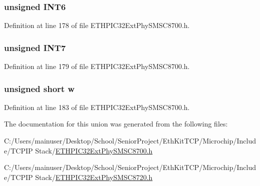 \hypertarget{union_____i_n_t_s_o_u_r_c_ebits__t_a32ed04340c8ad7c9e9615760fe9c56e9}{}
\subsubsection[{I\+N\+T6}]{\setlength{\rightskip}{0pt plus 5cm}unsigned I\+N\+T6}\label{union_____i_n_t_s_o_u_r_c_ebits__t_a32ed04340c8ad7c9e9615760fe9c56e9}


Definition at line 178 of file E\+T\+H\+P\+I\+C32\+Ext\+Phy\+S\+M\+S\+C8700.\+h.

\hypertarget{union_____i_n_t_s_o_u_r_c_ebits__t_ace3cce0f8bc2d246805ad9a8c00ea02e}{}
\subsubsection[{I\+N\+T7}]{\setlength{\rightskip}{0pt plus 5cm}unsigned I\+N\+T7}\label{union_____i_n_t_s_o_u_r_c_ebits__t_ace3cce0f8bc2d246805ad9a8c00ea02e}


Definition at line 179 of file E\+T\+H\+P\+I\+C32\+Ext\+Phy\+S\+M\+S\+C8700.\+h.

\hypertarget{union_____i_n_t_s_o_u_r_c_ebits__t_a160850a4684a3e82c2323033964f2e98}{}
\subsubsection[{w}]{\setlength{\rightskip}{0pt plus 5cm}unsigned short w}\label{union_____i_n_t_s_o_u_r_c_ebits__t_a160850a4684a3e82c2323033964f2e98}


Definition at line 183 of file E\+T\+H\+P\+I\+C32\+Ext\+Phy\+S\+M\+S\+C8700.\+h.



The documentation for this union was generated from the following files\+:\begin{DoxyCompactItemize}
\item 
C\+:/\+Users/mainuser/\+Desktop/\+School/\+Senior\+Project/\+Eth\+Kit\+T\+C\+P/\+Microchip/\+Include/\+T\+C\+P\+I\+P Stack/\hyperlink{_e_t_h_p_i_c32_ext_phy_s_m_s_c8700_8h}{E\+T\+H\+P\+I\+C32\+Ext\+Phy\+S\+M\+S\+C8700.\+h}\item 
C\+:/\+Users/mainuser/\+Desktop/\+School/\+Senior\+Project/\+Eth\+Kit\+T\+C\+P/\+Microchip/\+Include/\+T\+C\+P\+I\+P Stack/\hyperlink{_e_t_h_p_i_c32_ext_phy_s_m_s_c8720_8h}{E\+T\+H\+P\+I\+C32\+Ext\+Phy\+S\+M\+S\+C8720.\+h}\end{DoxyCompactItemize}
